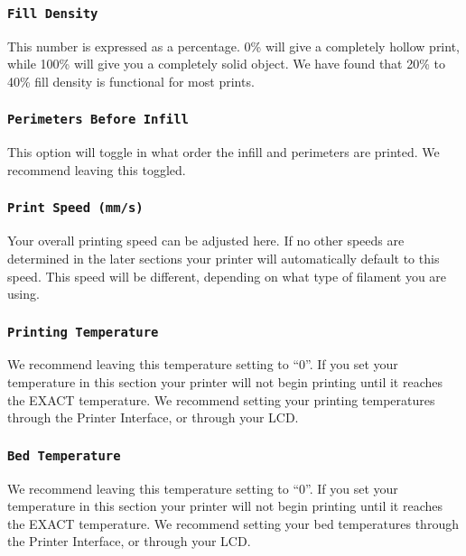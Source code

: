 \subsubsection{\texttt{Fill Density}}
This number is expressed as a percentage. 0\% will give a completely hollow print, while 100\% will give you a completely solid object. We have found that 20\% to 40\% fill density is functional for most prints.

\subsubsection{\texttt{Perimeters Before Infill}}
This option will toggle in what order the infill and perimeters are printed. We recommend leaving this toggled.
\subsubsection{\texttt{Print Speed (mm/s)}}
Your overall printing speed can be adjusted here. If no other speeds are determined in the later sections your printer will automatically default to this speed. This speed will be different, depending on what type of filament you are using.

\subsubsection{\texttt{Printing Temperature}}

We recommend leaving this temperature setting to “0”. If you set your temperature in this section your printer will not begin printing until it reaches the EXACT temperature. We recommend setting your printing temperatures through the Printer Interface, or through your LCD.

\subsubsection{\texttt{Bed Temperature}}
We recommend leaving this temperature setting to “0”. If you set your temperature in this section your printer will not begin printing until it reaches the EXACT temperature. We recommend setting your bed temperatures through the Printer Interface, or through your LCD.

